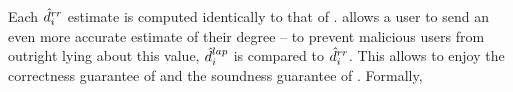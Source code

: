 %  

Each $\hat{d}^{rr}_i$ estimate is computed identically to that of \DegRRCheck{}. \DegHybrid{} allows a user to send an even more accurate estimate of their degree -- to prevent malicious users from outright lying about this value, $\hat{d}_i^{lap}$ is compared to $\hat{d}_i^{rr}$. This allows \DegHybrid{} to enjoy the correctness guarantee of \RLap{} and the soundness guarantee of \DegRRCheck{}. Formally,


